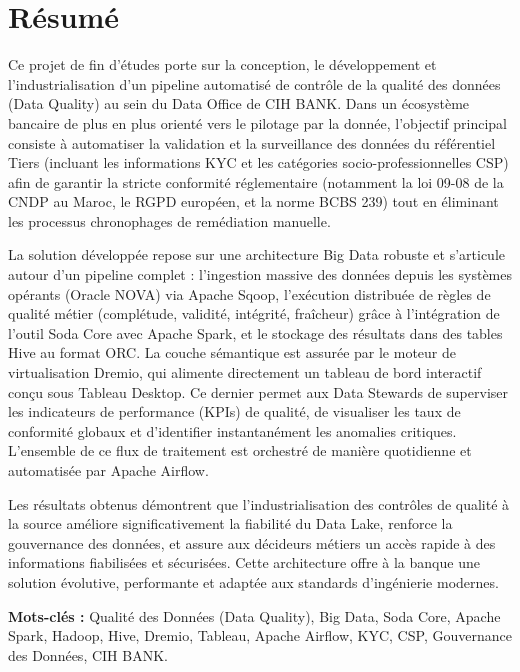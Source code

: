 \chapter*{Résumé}

Ce projet de fin d'études porte sur la conception, le développement et l'industrialisation d'un pipeline automatisé de contrôle de la qualité des données (Data Quality) au sein du Data Office de CIH BANK. Dans un écosystème bancaire de plus en plus orienté vers le pilotage par la donnée, l'objectif principal consiste à automatiser la validation et la surveillance des données du référentiel Tiers (incluant les informations KYC et les catégories socio-professionnelles CSP) afin de garantir la stricte conformité réglementaire (notamment la loi 09-08 de la CNDP au Maroc, le RGPD européen, et la norme BCBS 239) tout en éliminant les processus chronophages de remédiation manuelle. 

La solution développée repose sur une architecture Big Data robuste et s'articule autour d'un pipeline complet : l'ingestion massive des données depuis les systèmes opérants (Oracle NOVA) via Apache Sqoop, l'exécution distribuée de règles de qualité métier (complétude, validité, intégrité, fraîcheur) grâce à l'intégration de l'outil Soda Core avec Apache Spark, et le stockage des résultats dans des tables Hive au format ORC. La couche sémantique est assurée par le moteur de virtualisation Dremio, qui alimente directement un tableau de bord interactif conçu sous Tableau Desktop. Ce dernier permet aux Data Stewards de superviser les indicateurs de performance (KPIs) de qualité, de visualiser les taux de conformité globaux et d'identifier instantanément les anomalies critiques. L'ensemble de ce flux de traitement est orchestré de manière quotidienne et automatisée par Apache Airflow.

Les résultats obtenus démontrent que l'industrialisation des contrôles de qualité à la source améliore significativement la fiabilité du Data Lake, renforce la gouvernance des données, et assure aux décideurs métiers un accès rapide à des informations fiabilisées et sécurisées. Cette architecture offre à la banque une solution évolutive, performante et adaptée aux standards d'ingénierie modernes.

\vspace{1cm}
\noindent\textbf{Mots-clés :} Qualité des Données (Data Quality), Big Data, Soda Core, Apache Spark, Hadoop, Hive, Dremio, Tableau, Apache Airflow, KYC, CSP, Gouvernance des Données, CIH BANK.
